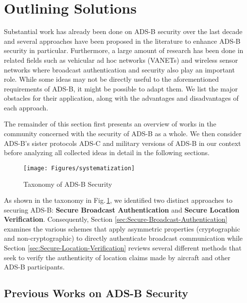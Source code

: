 \documentclass[english]{IEEEtran}
\begin{document}
\section{Outlining Solutions \label{sec:Outlining-Solutions}}

Substantial work has already been done on ADS-B security over the
last decade and several approaches have been proposed in the literature
to enhance ADS-B security in particular. Furthermore, a large amount
of research has been done in related fields such as vehicular ad hoc
networks (VANETs) and wireless sensor networks where broadcast authentication
and security also play an important role. While some ideas may not
be directly useful to the aforementioned requirements of ADS-B, it
might be possible to adapt them. We list the major obstacles for their
application, along with the advantages and disadvantages of each approach.

The remainder of this section first presents an overview of works
in the community concerned with the security of ADS-B as a whole.
We then consider ADS-B's sister protocols ADS-C and military versions
of ADS-B in our context before analyzing all collected ideas in detail
in the following sections.

\begin{figure}
\texttt{[image: Figures/systematization]}

\caption{Taxonomy of ADS-B Security \label{fig:Systematization-of-ADS-B}}
\end{figure}


As shown in the taxonomy in Fig.\,\ref{fig:Systematization-of-ADS-B},
we identified two distinct approaches to securing ADS-B: \textbf{Secure
Broadcast Authentication} and \textbf{Secure Location Verification}.
Consequently, Section \ref{sec:Secure-Broadcast-Authentication} examines
the various schemes that apply asymmetric properties (cryptographic
and non-cryptographic) to directly authenticate broadcast communication
while Section \ref{sec:Secure-Location-Verification} reviews several
different methods that seek to verify the authenticity of location
claims made by aircraft and other ADS-B participants.


\subsection{Previous Works on ADS-B Security}
\end{document}
